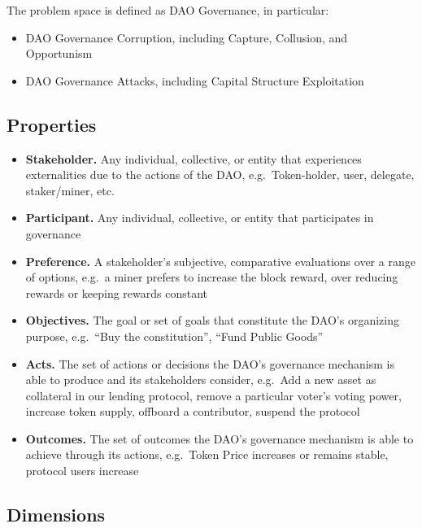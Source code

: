 \documentclass[
]{article}
\providecommand{\tightlist}{%
  \setlength{\itemsep}{0pt}\setlength{\parskip}{0pt}}
\begin{document}
The problem space is defined as DAO Governance, in particular:

\begin{itemize}
\tightlist
\item
  DAO Governance Corruption, including Capture, Collusion, and
  Opportunism
\item
  DAO Governance Attacks, including Capital Structure Exploitation
\end{itemize}

\hypertarget{properties}{%
\subsection{Properties}\label{properties}}

\begin{itemize}
\tightlist
\item
  \textbf{Stakeholder.} Any individual, collective, or entity that
  experiences externalities due to the actions of the DAO,
  e.g.~Token-holder, user, delegate, staker/miner, etc.
\item
  \textbf{Participant.} Any individual, collective, or entity that
  participates in governance
\item
  \textbf{Preference.} A stakeholder's subjective, comparative
  evaluations over a range of options, e.g.~a miner prefers to increase
  the block reward, over reducing rewards or keeping rewards constant
\item
  \textbf{Objectives.} The goal or set of goals that constitute the
  DAO's organizing purpose, e.g.~``Buy the constitution'', ``Fund Public
  Goods''
\item
  \textbf{Acts.} The set of actions or decisions the DAO's governance
  mechanism is able to produce and its stakeholders consider, e.g.~Add a
  new asset as collateral in our lending protocol, remove a particular
  voter's voting power, increase token supply, offboard a contributor,
  suspend the protocol
\item
  \textbf{Outcomes.} The set of outcomes the DAO's governance mechanism
  is able to achieve through its actions, e.g.~Token Price increases or
  remains stable, protocol users increase
\end{itemize}

\hypertarget{dimensions}{%
\subsection{Dimensions}\label{dimensions}}
\end{document}
